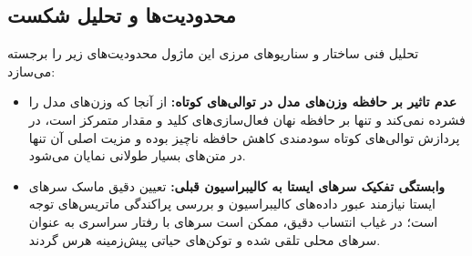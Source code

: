 \subsection{محدودیت‌ها و تحلیل شکست}
تحلیل فنی ساختار و سناریوهای مرزی این ماژول محدودیت‌های زیر را برجسته می‌سازد:
\begin{itemize}
    \item \textbf{عدم تاثیر بر حافظه وزن‌های مدل در توالی‌های کوتاه:} از آنجا که  وزن‌های مدل را فشرده نمی‌کند و تنها بر حافظه نهان فعال‌سازی‌های کلید و مقدار متمرکز است، در پردازش توالی‌های کوتاه سودمندی کاهش حافظه ناچیز بوده و مزیت اصلی آن تنها در متن‌های بسیار طولانی نمایان می‌شود.
    \item \textbf{وابستگی تفکیک سرهای ایستا به کالیبراسیون قبلی:} تعیین دقیق ماسک سرهای ایستا نیازمند عبور داده‌های کالیبراسیون و بررسی پراکندگی ماتریس‌های توجه است؛ در غیاب انتساب دقیق، ممکن است سرهای با رفتار سراسری به عنوان سرهای محلی تلقی شده و توکن‌های حیاتی پیش‌زمینه هرس گردند.
\end{itemize}
